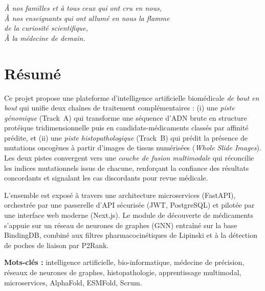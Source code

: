 \documentclass[12pt,a4paper,oneside]{book}
\begin{document}
\newpage
\thispagestyle{empty}
\vspace*{5cm}
\begin{center}
\itshape\large
À nos familles et à tous ceux qui ont cru en nous,\\[0.5cm]
À nos enseignants qui ont allumé en nous la flamme\\
de la curiosité scientifique,\\[0.5cm]
À la médecine de demain.
\end{center}

\frontmatter

\chapter*{Résumé}

Ce projet propose une plateforme d'intelligence artificielle biomédicale
\textit{de bout en bout} qui unifie deux chaînes de traitement complémentaires :
(i) une \emph{piste génomique} (Track~A) qui transforme une séquence d'ADN brute
en structure protéique tridimensionnelle puis en candidats-médicaments classés
par affinité prédite, et (ii) une \emph{piste histopathologique} (Track~B) qui
prédit la présence de mutations oncogènes à partir d'images de tissus
numérisées (\textit{Whole Slide Images}). Les deux pistes convergent vers une
\emph{couche de fusion multimodale} qui réconcilie les indices mutationnels
issus de chacune, renforçant la confiance des résultats concordants et
signalant les cas discordants pour revue médicale.

L'ensemble est exposé à travers une architecture microservices (FastAPI),
orchestrée par une passerelle d'API sécurisée (JWT, PostgreSQL) et pilotée par
une interface web moderne (Next.js). Le module de découverte de médicaments
s'appuie sur un réseau de neurones de graphes (GNN) entraîné sur la base
BindingDB, combiné aux filtres pharmacocinétiques de Lipinski et à la détection
de poches de liaison par P2Rank.

\medskip
\noindent\textbf{Mots-clés :} intelligence artificielle, bio-informatique,
médecine de précision, réseaux de neurones de graphes, histopathologie,
apprentissage multimodal, microservices, AlphaFold, ESMFold, Scrum.
\end{document}
